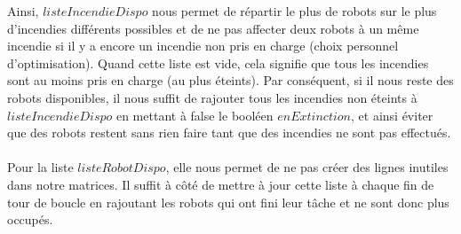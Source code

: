 \documentclass[12pt,a4paper]{article}
\begin{document}
Ainsi, $listeIncendieDispo$ nous permet de répartir le plus de robots sur le plus d'incendies différents possibles et de ne pas affecter deux robots à un même incendie si il y a encore un incendie non pris en charge (choix personnel d'optimisation). Quand cette liste est vide, cela signifie que tous les incendies sont au moins pris en charge (au plus éteints). Par conséquent, si il nous reste des robots disponibles, il nous suffit de rajouter tous les incendies non éteints à $listeIncendieDispo$ en mettant à false le booléen $enExtinction$, et ainsi éviter que des robots restent sans rien faire tant que des incendies ne sont pas effectués.\\\\
Pour la liste $listeRobotDispo$, elle nous permet de ne pas créer des lignes inutiles dans notre matrices. Il suffit à côté de mettre à jour cette liste à chaque fin de tour de boucle en rajoutant les robots qui ont fini leur tâche et ne sont donc plus occupés.
\end{document}
